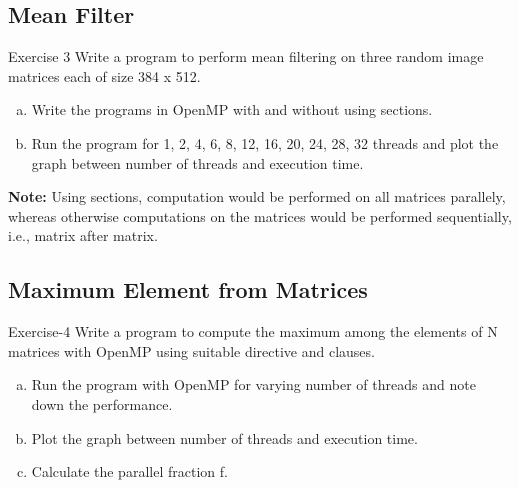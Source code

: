 \documentclass{beamer}
\begin{document}
		\subsection{Mean Filter}
			\begin{frame}{Exercise 3}
				Write a program to perform mean filtering on three random image matrices each of size 384 x 512.
				\begin{enumerate}[(a)]
					\item Write the programs in OpenMP with and without using sections.
					\item Run the program for 1, 2, 4, 6, 8, 12, 16, 20, 24, 28, 32 threads and plot the graph between number of threads and execution time.
				\end{enumerate}
				
				\begin{block}{}
					\scriptsize \textbf{Note:} Using sections, computation would be performed on all matrices parallely, whereas otherwise computations on the matrices would be performed sequentially, i.e., matrix after matrix.
				\end{block}
			\end{frame}
			
		\subsection{Maximum Element from Matrices}
			\begin{frame}{Exercise-4}
				Write a program to compute the maximum among the elements of N matrices with OpenMP using suitable directive and clauses.
				
				\begin{enumerate}[(a)]
					\item Run the program with OpenMP for varying number of threads and note down the performance.
					\item Plot the graph between number of threads and execution time.
					\item Calculate the parallel fraction f.
				\end{enumerate}
				
			\end{frame}
		
			
\end{document}
